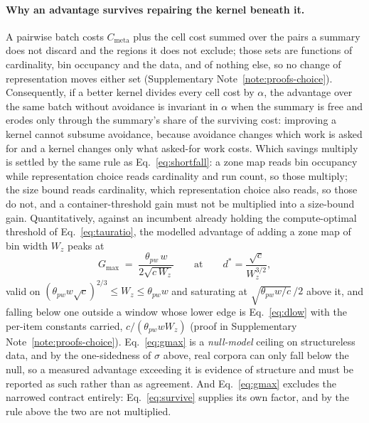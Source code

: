 \paragraph*{Why an advantage survives repairing the kernel beneath it.}
A pairwise batch costs $C_{\mathrm{meta}}$ plus the cell cost summed over the pairs a summary does not
discard and the regions it does not exclude; those sets are functions of cardinality, bin occupancy and
the data, and of nothing else, so no change of representation moves either set (Supplementary Note~\ref{note:proofs-choice}).
Consequently, if a better kernel divides every cell cost by $\alpha$, the advantage over the same batch
without avoidance is invariant in $\alpha$ when the summary is free and erodes only through the
summary's share of the surviving cost: improving a kernel cannot subsume avoidance, because avoidance
changes which work is asked for and a kernel changes only what asked-for work costs. Which savings
multiply is settled by the same rule as Eq.~\eqref{eq:shortfall}: a zone map reads bin occupancy while
representation choice reads cardinality and run count, so those multiply; the size bound reads
cardinality, which representation choice also reads, so those do not, and a container-threshold gain
must not be multiplied into a size-bound gain. Quantitatively, against an incumbent already holding the
compute-optimal threshold of Eq.~\eqref{eq:tauratio}, the modelled advantage of adding a zone map of bin
width $W_z$ peaks at
\begin{equation}
G_{\max}\;=\;\frac{\theta_{pw}\,w}{2\sqrt{c\,W_z}}
\qquad\text{at}\qquad d^{*}=\frac{\sqrt{c}}{W_z^{3/2}},
\label{eq:gmax}
\end{equation}
valid on $(\theta_{pw}w\sqrt{c})^{2/3}\le W_z\le\theta_{pw}w$ and saturating at
$\sqrt{\theta_{pw}w/c}\,/2$ above it, and falling below one outside a window whose lower edge is
Eq.~\eqref{eq:dlow} with the per-item constants carried, $c/(\theta_{pw}wW_z)$ (proof in Supplementary Note~\ref{note:proofs-choice}). Eq.~\eqref{eq:gmax} is a \emph{null-model} ceiling on structureless data, and by the
one-sidedness of $\sigma$ above, real corpora can only fall below the null, so a measured advantage
exceeding it is evidence of structure and must be reported as such rather than as agreement. And
Eq.~\eqref{eq:gmax} excludes the narrowed contract entirely: Eq.~\eqref{eq:survive} supplies its own
factor, and by the rule above the two are not multiplied.

